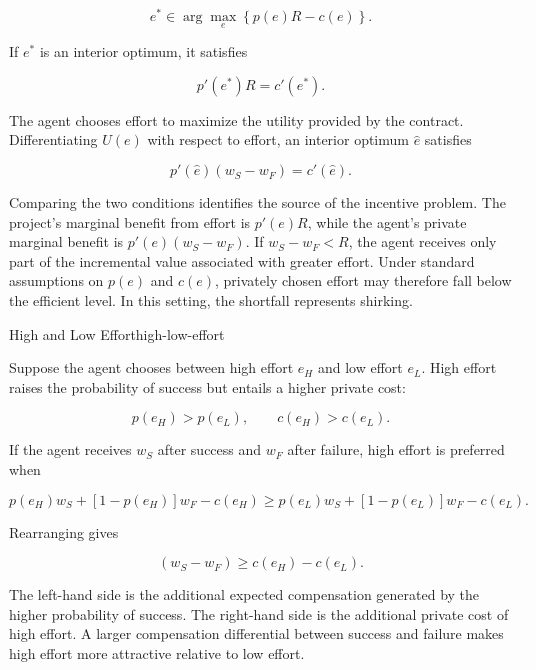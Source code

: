 \begin{equation}
e^*\in\arg\max_e\left\{p(e)R-c(e)\right\}.
\label{eq:ch3-efficient-effort}
\end{equation}

If $e^*$ is an interior optimum, it satisfies

\begin{equation}
p'(e^*)R=c'(e^*).
\label{eq:ch3-efficient-effort-foc}
\end{equation}

The agent chooses effort to maximize the utility provided by the contract. Differentiating $U(e)$ with respect to effort, an interior optimum $\hat e$ satisfies

\begin{equation}
p'(\hat e)(w_S-w_F)=c'(\hat e).
\label{eq:ch3-agent-effort-foc}
\end{equation}

Comparing the two conditions identifies the source of the incentive problem. The project's marginal benefit from effort is $p'(e)R$, while the agent's private marginal benefit is $p'(e)(w_S-w_F)$. If $w_S-w_F<R$, the agent receives only part of the incremental value associated with greater effort. Under standard assumptions on $p(e)$ and $c(e)$, privately chosen effort may therefore fall below the efficient level. In this setting, the shortfall represents shirking.

\begin{example}{High and Low Effort}{high-low-effort}

Suppose the agent chooses between high effort $e_H$ and low effort $e_L$. High effort raises the probability of success but entails a higher private cost:

\begin{equation*}
p(e_H)>p(e_L),
\qquad
c(e_H)>c(e_L).
\end{equation*}

If the agent receives $w_S$ after success and $w_F$ after failure, high effort is preferred when

\begin{equation*}
p(e_H)w_S+[1-p(e_H)]w_F-c(e_H)
\geq
p(e_L)w_S+[1-p(e_L)]w_F-c(e_L).
\end{equation*}

Rearranging gives

\begin{equation*}
[p(e_H)-p(e_L)](w_S-w_F)
\geq
c(e_H)-c(e_L).
\label{eq:ch3-effort-spread}
\end{equation*}

The left-hand side is the additional expected compensation generated by the higher probability of success. The right-hand side is the additional private cost of high effort. A larger compensation differential between success and failure makes high effort more attractive relative to low effort.

\end{example}

